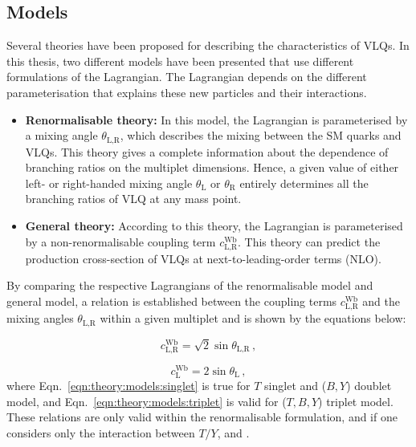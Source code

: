 \subsection{Models}%
\label{sec:theory:models}

Several theories have been proposed for describing the characteristics of VLQs. In this thesis, two different models have been presented that use different formulations of the Lagrangian. The Lagrangian depends on the different parameterisation that explains these new particles and their interactions. 

\begin{itemize}
\item \textbf{Renormalisable theory:} 
In this model, the Lagrangian is parameterised by a mixing angle $\theta_{\text{L,R}}$, which describes the mixing between the SM quarks and VLQs. This theory gives a complete information about the dependence of branching ratios on the multiplet dimensions. Hence, a given value of either left- or right-handed mixing angle $\theta_{\text{L}}$ or $\theta_{\text{R}}$ entirely determines all the branching ratios of VLQ at any mass point.~\cite{aguilar}

\item \textbf{General theory:} According to this theory, the Lagrangian is parameterised by a non-renormalisable coupling term $c_{\text{L,R}}^{\text{Wb}}$. This theory can predict the production cross-section of VLQs at next-to-leading-order terms (NLO).~\cite{wulzer}
\end{itemize}

By comparing the respective Lagrangians of the renormalisable model and general model, a relation is established between the coupling terms $c_{\text{L,R}}^{\text{Wb}}$ and the mixing angles $\theta_{\text{L,R}}$ within a given multiplet and is shown by the equations below:

\begin{equation}
c_{\text{L,R}}^{\text{Wb}} = \sqrt{2}\sin\theta_{\text{L,R}} \,,
\label{eqn:theory:models:singlet}
\end{equation}

\begin{equation}
c_{\text{L}}^{\text{Wb}} = 2\sin\theta_{\text{L}} \,,
\label{eqn:theory:models:triplet}
\end{equation}
where Eqn.\ \ref{eqn:theory:models:singlet} is true for $T$ singlet and ($B,Y$) doublet model, and Eqn.\ \ref{eqn:theory:models:triplet} is valid for ($T,B,Y$) triplet model. These relations are only valid within the renormalisable formulation, and if one considers only the interaction between $T/Y$, \PW and \Pbottom.~\cite{vlqpaper}



